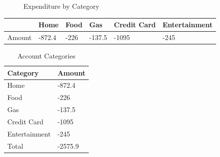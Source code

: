 \documentclass[11pt,a4paper]{article}
\begin{document}
\begin{figure}[h]
\caption{Expenditure by Category}
\end{figure}

\begin{table}[h]
\begin{tabular}{|l|l|l|l|l|l|}
\hline
 & Home & Food & Gas & Credit Card & Entertainment \\ \hline
Amount & -872.4 & -226 & -137.5 & -1095 & -245 \\ \hline
\end{tabular}
\end{table}

\begin{table}[h]
\caption{Account Categories}
\begin{tabular}{|l|l|}
\hline
Category & Amount \\ \hline
Home & -872.4 \\ \hline
Food & -226 \\ \hline
Gas & -137.5 \\ \hline
Credit Card & -1095 \\ \hline
Entertainment & -245 \\ \hline
Total & -2575.9 \\ \hline
\end{tabular}
\end{table}
\end{document}
